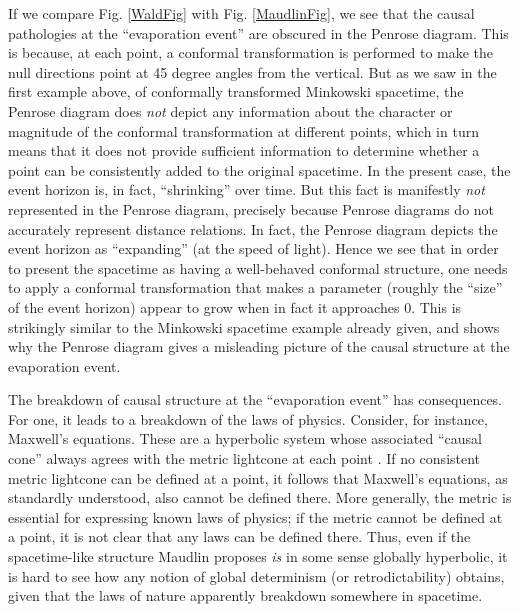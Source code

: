 \documentclass[authoryear,12pt,3p]{jowarticle}
\begin{document}
If we compare Fig. \ref{WaldFig} with Fig. \ref{MaudlinFig}, we see that the causal pathologies at the ``evaporation event'' are obscured in the Penrose diagram.  This is because, at each point, a conformal transformation is performed to make the null directions point at 45 degree angles from the vertical.  But as we saw in the first example above, of conformally transformed Minkowski spacetime, the Penrose diagram does \emph{not} depict any information about the character or magnitude of the conformal transformation at different points, which in turn means that it does not provide sufficient information to determine whether a point can be consistently added to the original spacetime.  In the present case, the event horizon is, in fact, ``shrinking'' over time.  But this fact is manifestly \emph{not} represented in the Penrose diagram, precisely because Penrose diagrams do not accurately represent distance relations.  In fact, the Penrose diagram depicts the event horizon as ``expanding'' (at the speed of light).  Hence we see that in order to present the spacetime as having a well-behaved conformal structure, one needs to apply a conformal transformation that makes a parameter (roughly the ``size'' of the event horizon) appear to grow when in fact it approaches $0$.  This is strikingly similar to the Minkowski spacetime example already given, and shows why the Penrose diagram gives a misleading picture of the causal structure at the evaporation event.

The breakdown of causal structure at the ``evaporation event'' has consequences.  For one, it leads to a breakdown of the laws of physics.  Consider, for instance, Maxwell's equations.  These are a hyperbolic system whose associated ``causal cone'' always agrees with the metric lightcone at each point \citep{GerochPDE}.  If no consistent metric lightcone can be defined at a point, it follows that Maxwell's equations, as standardly understood, also cannot be defined there.  More generally, the metric is essential for expressing known laws of physics; if the metric cannot be defined at a point, it is not clear that any laws can be defined there.  Thus, even if the spacetime-like structure Maudlin proposes \emph{is} in some sense globally hyperbolic, it is hard to see how any notion of global determinism (or retrodictability) obtains, given that the laws of nature apparently breakdown somewhere in spacetime.
\end{document}
